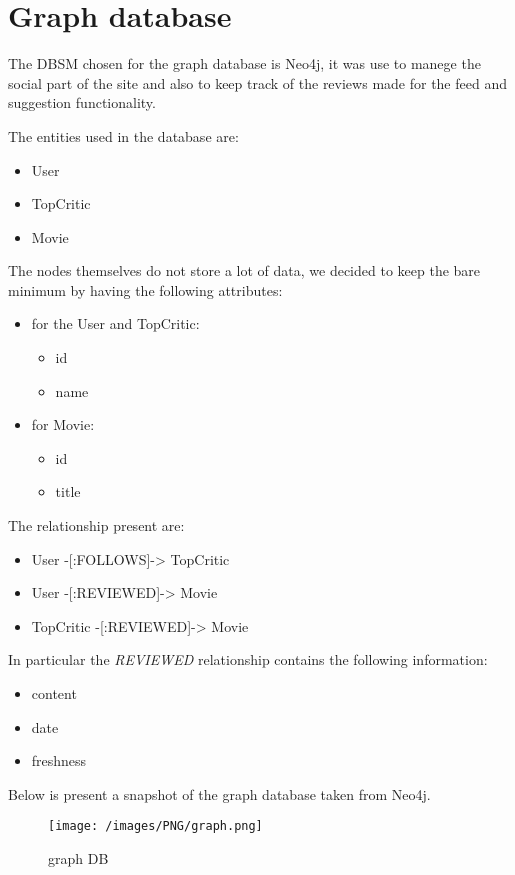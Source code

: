 

\chapter{Graph database}
\justifying
The DBSM chosen for the graph database is Neo4j, it was use to manege the social part of the site and also to keep track of the reviews made for the feed and suggestion functionality.

The entities used in the database are:
\begin{itemize}
	\item User
	\item TopCritic
	\item Movie
\end{itemize}
The nodes themselves do not store a lot of data, we decided to keep the bare minimum by having the following attributes:
\begin{itemize}
	\item for the User and TopCritic:
	\begin{itemize}
		\item id
		\item name
	\end{itemize}
	\item for Movie:
	\begin{itemize}
		\item id
		\item title
	\end{itemize}
\end{itemize}
The relationship present are:
\begin{itemize}
	\item User -[:FOLLOWS]-> TopCritic
	\item User -[:REVIEWED]-> Movie
	\item TopCritic -[:REVIEWED]-> Movie
\end{itemize}
In particular the \emph{REVIEWED} relationship contains the following information:
\begin{itemize}
	\item content
	\item date
	\item freshness
\end{itemize}

Below is present a snapshot of the graph database taken from Neo4j.

\begin{figure}[H]
\begin{center}
\texttt{[image: /images/PNG/graph.png]}
\caption{graph DB}
\label{fig:graphDB}
\end{center}
\end{figure}

